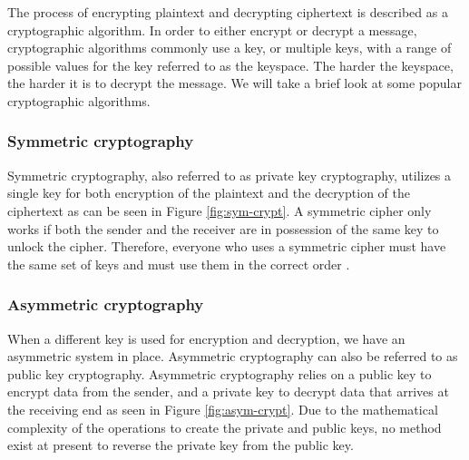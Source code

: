 The process of encrypting plaintext and decrypting ciphertext is described as a cryptographic algorithm. In order to either encrypt or decrypt a message, cryptographic algorithms commonly use a key, or multiple keys, with a range of possible values for the key referred to as the keyspace. The harder the keyspace, the harder it is to decrypt the message. We will take a brief look at some popular cryptographic algorithms.

\subsubsection{Symmetric cryptography}
Symmetric cryptography, also referred to as private key cryptography, utilizes a single key for both encryption of the plaintext and the decryption of the ciphertext as can be seen in Figure \ref{fig:sym-crypt}. A symmetric cipher only works if both the sender and the receiver are in possession of the same key to unlock the cipher. Therefore, everyone who uses a symmetric cipher must have the same set of keys and must use them in the correct order \cite{dooley2018history}.


\subsubsection{Asymmetric cryptography}
When a different key is used for encryption and decryption, we have an asymmetric system in place. Asymmetric cryptography can also be referred to as public key cryptography. Asymmetric cryptography relies on a public key to encrypt data from the sender, and a private key to decrypt data that arrives at the receiving end as seen in Figure \ref{fig:asym-crypt}. Due to the mathematical complexity of the operations to create the private and public keys, no method exist at present to reverse the private key from the public key.

